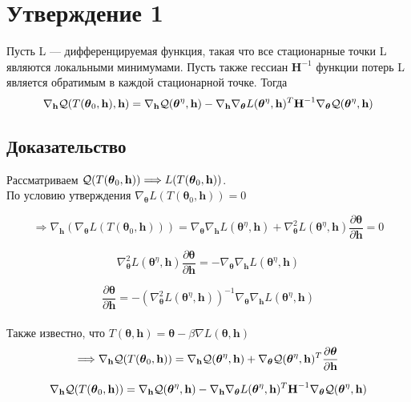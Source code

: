 \documentclass[a4paper,12pt,notitlepage]{article}
\def\Q{{\cal Q}}
\def\t{{\boldsymbol{\theta}}}
\def\h{{\textbf{h}}}
\def\H{{\textbf{H}}}
\begin{document}

\section*{Утверждение 1}
Пусть L — дифференцируемая функция, такая что все стационарные точки L  являются локальными минимумами. Пусть также гессиан $\H^{-1}$ функции потерь L является обратимым в каждой стационарной точке.
Тогда
$$ \nabla_{\h}\Q (T(\t_0, \h), \h) = \nabla_\h\Q(\t^{\eta}, \h) - 
\nabla_\h \nabla_\t L(\t^\eta, \h)^T\H^{-1}\nabla_\t\Q(\t^\eta, \h)$$

\subsection*{Доказательство}

Рассматриваем $\Q(T(\t_0, \h)) \Longrightarrow L(T(\t_0, \h))$.
\\

По условию утверждения $\nabla_\t L(T(\t_0, \h))=0$


$$\Longrightarrow \nabla_\h (\nabla_\t L(T(\t_0, \h))) = \nabla_\t \nabla_\h L(\t^\eta, \h)+
\nabla_\t^2 L(\t^\eta, \h)\frac{\partial\t}{\partial\h} = 0$$

$$
\nabla_\t^2 L(\t^\eta, \h)\frac{\partial\t}{\partial\h} = -\nabla_\t \nabla_\h L(\t^\eta, \h)
$$

$$
\frac{\partial\t}{\partial\h} = -(\nabla_\t^2 L(\t^\eta, \h))^{-1}\nabla_\t \nabla_\h L(\t^\eta, \h)
$$
\\

Также известно, что
$
T(\t, \h) = \t - \beta\nabla L(\t, \h)
$
\\

$$
\Longrightarrow \nabla_\h \Q(T(\t_0, \h)) = \nabla_\h \Q(\t^\eta, \h) + \nabla_\t \Q(\t^\eta, \h)^T\frac{\partial\t}{\partial\h}
$$

$$
\nabla_\h \Q(T(\t_0, \h)) = \nabla_\h \Q(\t^\eta, \h)- 
\nabla_\h \nabla_\t L(\t^\eta, \h)^T\H^{-1}\nabla_\t\Q(\t^\eta, \h)
$$
\end{document}
